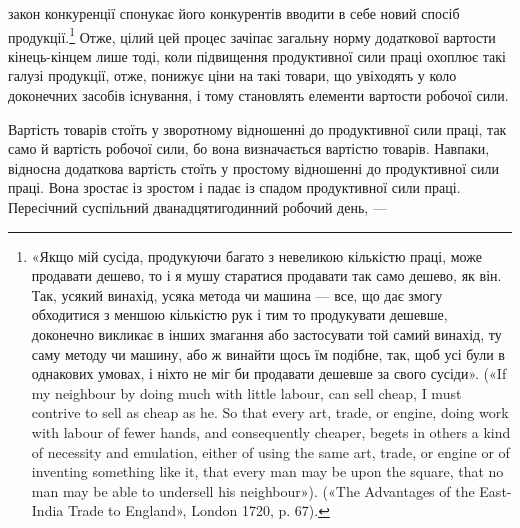 закон конкуренції спонукає його конкурентів вводити в себе новий спосіб продукції.\footnote{
«Якщо мій сусіда, продукуючи багато з невеликою кількістю праці,
може продавати дешево, то і я мушу старатися продавати так само дешево,
як він. Так, усякий винахід, усяка метода чи машина — все, що дає змогу
обходитися з меншою кількістю рук і тим то продукувати дешевше, доконечно викликає в інших змагання
або застосувати той самий винахід,
ту саму методу чи машину, або ж винайти щось їм подібне, так, щоб
усі були в однакових умовах, і ніхто не міг би продавати дешевше за свого
сусіди». («If my neighbour by doing much with little labour, can sell
cheap, I must contrive to sell as cheap as he. So that every art, trade, or
engine, doing work with labour of fewer hands, and consequently cheaper,
begets in others a kind of necessity and emulation, either of using the same
art, trade, or engine or of inventing something like it, that every man
may be upon the square, that no man may be able to undersell his neighbour»). («The Advantages of
the East-India Trade to England», London
1720, p. 67).
}
Отже, цілий цей процес зачіпає загальну норму додаткової вартости кінець-кінцем лише тоді, коли
підвищення продуктивної
сили праці охоплює такі галузі продукції, отже, понижує ціни
на такі товари, що увіходять у коло доконечних засобів існування,
і тому становлять елементи вартости робочої сили.

Вартість товарів стоїть у зворотному відношенні до продуктивної сили праці, так само й вартість
робочої сили, бо вона
визначається вартістю товарів. Навпаки, відносна додаткова
вартість стоїть у простому відношенні до продуктивної сили праці.
Вона зростає із зростом і падає із спадом продуктивної сили праці.
Пересічний суспільний дванадцятигодинний робочий день, —
\parbreak{}  %
